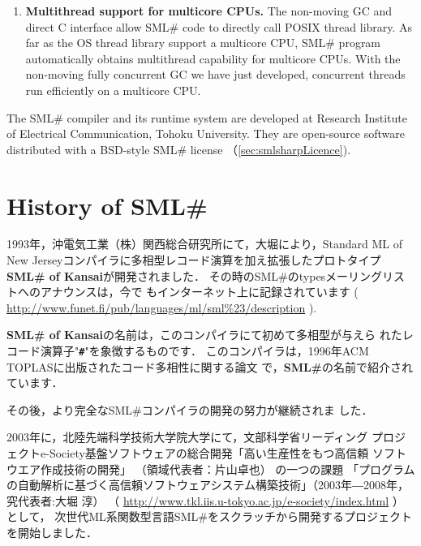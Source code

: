 \documentclass{jbook}
\newif\ifjp
\newcommand{\txt}[2]{#2}
\newcommand{\smlsharp}{SML\#}
\newcommand{\code}[1]{\mbox{\large\tt #1}}
\begin{document}
\begin{enumerate}
\item {\bf Multithread support for multicore CPUs.}
	The non-moving GC \cite{ueno11icfp} and direct C interface allow
\smlsharp{} code to directly call POSIX thread library.
	As far as the OS thread library support a multicore CPU,
\smlsharp{} program automatically obtains multithread capability for
multicore CPUs.
	With the non-moving fully concurrent GC we have just developed, 
concurrent threads run efficiently on a multicore CPU.

\end{enumerate}

	The \smlsharp{} compiler and its runtime system are developed at
Research Institute of Electrical Communication,  Tohoku University.
	They are open-source software distributed with a BSD-style
\smlsharp{} license （\ref{sec:smlsharpLicence}).
\fi%

\section{\txt{\smlsharp{}の歴史}{History of \smlsharp{}}}
\label{sec:smlsharpHistory}

\ifjp%
	1993年，沖電気工業（株）関西総合研究所にて，大堀により，Standard
ML of New Jerseyコンパイラに多相型レコード演算を加え拡張したプロトタイプ
{\bf SML\# of Kansai}が開発されました．
	その時の\smlsharp{}のtypesメーリングリストへのアナウンスは，今で
もインターネット上に記録されています
(
\url{http://www.funet.fi/pub/languages/ml/sml%23/description}
).

	{\bf SML\# of Kansai}の名前は，このコンパイラにて初めて多相型が与えら
れたレコード演算子"{\bf \code{\#}}"を象徴するものです．
	このコンパイラは，1996年ACM TOPLASに出版されたコード多相性に関する論文
\cite{ohor95toplas}で，{\bf \smlsharp{}}の名前で紹介されています．

	その後，より完全な\smlsharp{}コンパイラの開発の努力が継続されま
した．

	2003年に，北陸先端科学技術大学院大学にて，文部科学省リーディング
プロジェクトe-Society基盤ソフトウェアの総合開発「高い生産性をもつ高信頼
ソフトウエア作成技術の開発」
（領域代表者：片山卓也）
の一つの課題
「プログラムの自動解析に基づく高信頼ソフトウェアシステム構築技術」（2003年―2008年，究代表者:大堀 淳）
（
\url{http://www.tkl.iis.u-tokyo.ac.jp/e-society/index.html}
）
として，
次世代ML系関数型言語\smlsharp{}をスクラッチから開発するプロジェクトを開始しました．
\end{document}
